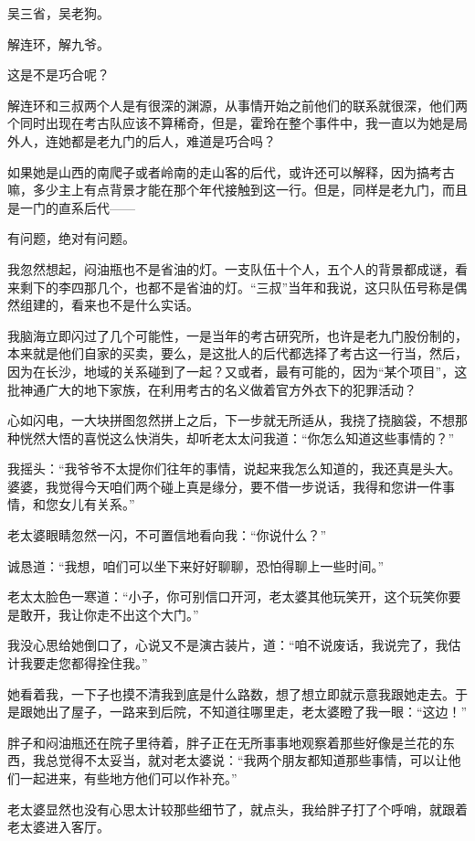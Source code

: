 吴三省，吴老狗。

解连环，解九爷。

这是不是巧合呢？

解连环和三叔两个人是有很深的渊源，从事情开始之前他们的联系就很深，他们两个同时出现在考古队应该不算稀奇，但是，霍玲在整个事件中，我一直以为她是局外人，连她都是老九门的后人，难道是巧合吗？

如果她是山西的南爬子或者岭南的走山客的后代，或许还可以解释，因为搞考古嘛，多少主上有点背景才能在那个年代接触到这一行。但是，同样是老九门，而且是一门的直系后代——

有问题，绝对有问题。

我忽然想起，闷油瓶也不是省油的灯。一支队伍十个人，五个人的背景都成谜，看来剩下的李四那几个，也都不是省油的灯。“三叔”当年和我说，这只队伍号称是偶然组建的，看来也不是什么实话。

我脑海立即闪过了几个可能性，一是当年的考古研究所，也许是老九门股份制的，本来就是他们自家的买卖，要么，是这批人的后代都选择了考古这一行当，然后，因为在长沙，地域的关系碰到了一起？又或者，最有可能的，因为“某个项目”，这批神通广大的地下家族，在利用考古的名义做着官方外衣下的犯罪活动？

心如闪电，一大块拼图忽然拼上之后，下一步就无所适从，我挠了挠脑袋，不想那种恍然大悟的喜悦这么快消失，却听老太太问我道：“你怎么知道这些事情的？”

我摇头：“我爷爷不太提你们往年的事情，说起来我怎么知道的，我还真是头大。婆婆，我觉得今天咱们两个碰上真是缘分，要不借一步说话，我得和您讲一件事情，和您女儿有关系。”

老太婆眼睛忽然一闪，不可置信地看向我：“你说什么？”

诚恳道：“我想，咱们可以坐下来好好聊聊，恐怕得聊上一些时间。”

老太太脸色一寒道：“小子，你可别信口开河，老太婆其他玩笑开，这个玩笑你要是敢开，我让你走不出这个大门。”

我没心思给她倒口了，心说又不是演古装片，道：“咱不说废话，我说完了，我估计我要走您都得拴住我。”

她看着我，一下子也摸不清我到底是什么路数，想了想立即就示意我跟她走去。于是跟她出了屋子，一路来到后院，不知道往哪里走，老太婆瞪了我一眼：“这边！”

胖子和闷油瓶还在院子里待着，胖子正在无所事事地观察着那些好像是兰花的东西，我总觉得不太妥当，就对老太婆说：“我两个朋友都知道那些事情，可以让他们一起进来，有些地方他们可以作补充。”

老太婆显然也没有心思太计较那些细节了，就点头，我给胖子打了个呼哨，就跟着老太婆进入客厅。

